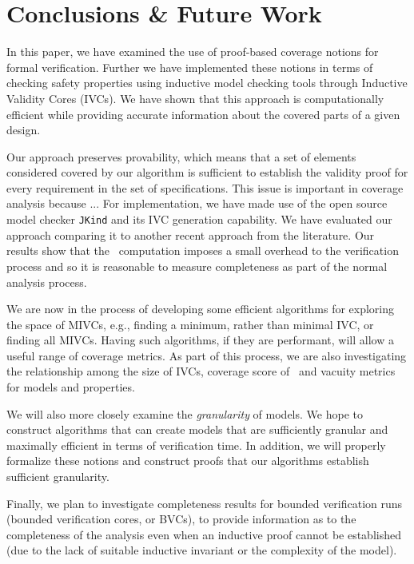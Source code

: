 \section{Conclusions \& Future Work}
\label{sec:conclusion}

In this paper, we have examined the use of proof-based coverage notions for formal verification.
Further we have implemented these notions in terms of checking safety properties using inductive model checking tools through Inductive Validity Cores (IVCs).  We have shown that this approach
is computationally efficient while providing accurate information about the covered parts of a given design.  

Our approach preserves provability, which means that a set of elements considered covered by our algorithm is sufficient to establish the validity proof for every requirement in the set of specifications. This issue is important in coverage analysis because ... 
%
For implementation, we have made use of the open source model checker \texttt{JKind} and its IVC generation capability. We have evaluated our approach comparing it to another recent approach from the literature.  Our results show that the \ivccov\ computation imposes a small overhead to the verification process and so it is reasonable to measure completeness as part of the normal analysis process. 

We are now in the process of developing some efficient algorithms for exploring the space of MIVCs, e.g., finding a minimum, rather than minimal IVC, or finding all MIVCs.  Having such algorithms, if they are performant, will allow a useful range of coverage metrics.  As part of this process, we are also investigating the relationship among the size of IVCs, coverage score of \ivccov\, and vacuity metrics for models and properties.

We will also more closely examine the {\em granularity} of models.  We hope to construct algorithms that can create models that are sufficiently granular and maximally efficient in terms of verification time.  In addition, we will properly formalize these notions and construct proofs that our algorithms establish sufficient granularity.

Finally, we plan to investigate completeness results for bounded verification runs (bounded verification cores, or BVCs), to provide information as to the completeness of the analysis even when an inductive proof cannot be established (due to the lack of suitable inductive invariant or the complexity of the model).

